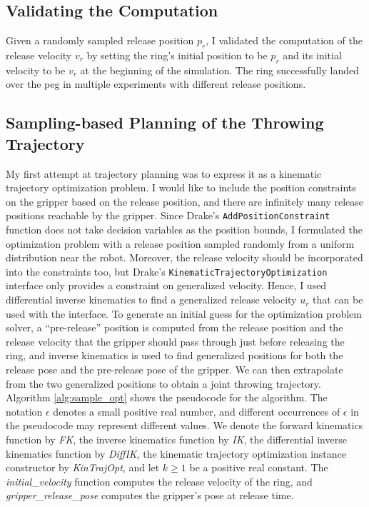 \documentclass[conference]{IEEEtran}
\begin{document}
\subsection{Validating the Computation}
Given a randomly sampled release position $p_r$, I validated the computation of the release velocity $v_r$ by setting the ring's initial position to be $p_r$ and its initial velocity to be $v_r$ at the beginning of the simulation. The ring successfully landed over the peg in multiple experiments with different release positions.

\subsection{Sampling-based Planning of the Throwing Trajectory}
My first attempt at trajectory planning was to express it as a kinematic trajectory optimization problem. I would like to include the position constraints on the gripper based on the release position, and there are infinitely many release positions reachable by the gripper. Since Drake's \texttt{AddPositionConstraint} function does not take decision variables as the position bounds, I formulated the optimization problem with a release position sampled randomly from a uniform distribution near the robot. Moreover, the release velocity should be incorporated into the constraints too, but Drake's \texttt{KinematicTrajectoryOptimization} interface only provides a constraint on generalized velocity. Hence, I used differential inverse kinematics to find a generalized release velocity $u_r$ that can be used with the interface. To generate an initial guess for the optimization problem solver, a ``pre-release'' position is computed from the release position and the release velocity that the gripper should pass through just before releasing the ring, and inverse kinematics is used to find generalized positions for both the release pose and the pre-release pose of the gripper. We can then extrapolate from the two generalized positions to obtain a joint throwing trajectory. Algorithm \ref{alg:sample_opt} shows the pseudocode for the algorithm. The notation $\epsilon$ denotes a small positive real number, and different occurrences of $\epsilon$ in the pseudocode may represent different values. We denote the forward kinematics function by \textit{FK}, the inverse kinematics function by \textit{IK}, the differential inverse kinematics function by \textit{DiffIK}, the kinematic trajectory optimization instance constructor by \textit{KinTrajOpt}, and let $k \geq 1$ be a positive real constant. The \textit{initial\_velocity} function computes the release velocity of the ring, and \textit{gripper\_release\_pose} computes the gripper's pose at release time.
\end{document}
